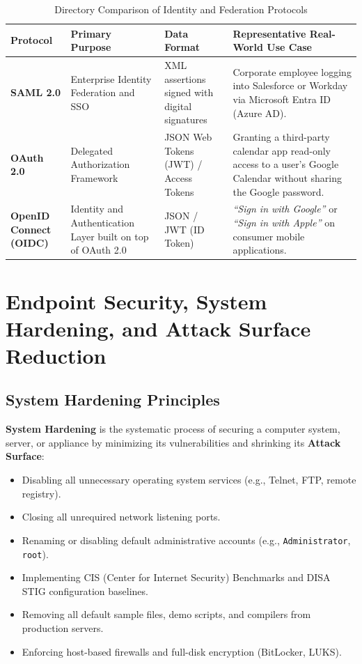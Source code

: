 \begin{table}[htbp]
\centering
\caption{Directory Comparison of Identity and Federation Protocols}
\label{tab:identity_protocols}
\begin{tabularx}{\textwidth}{p{2.5cm} p{2.8cm} X X}
\toprule
\textbf{Protocol} & \textbf{Primary Purpose} & \textbf{Data Format} & \textbf{Representative Real-World Use Case} \\
\midrule
\textbf{SAML 2.0} & Enterprise Identity Federation and SSO & XML assertions signed with digital signatures & Corporate employee logging into Salesforce or Workday via Microsoft Entra ID (Azure AD). \\
\textbf{OAuth 2.0} & Delegated Authorization Framework & JSON Web Tokens (JWT) / Access Tokens & Granting a third-party calendar app read-only access to a user's Google Calendar without sharing the Google password. \\
\textbf{OpenID Connect (OIDC)} & Identity and Authentication Layer built on top of OAuth 2.0 & JSON / JWT (ID Token) & \textit{``Sign in with Google''} or \textit{``Sign in with Apple''} on consumer mobile applications. \\
\bottomrule
\end{tabularx}
\end{table}

\newpage
\section{Endpoint Security, System Hardening, and Attack Surface Reduction}

\subsection{System Hardening Principles}

\textbf{System Hardening} is the systematic process of securing a computer system, server, or appliance by minimizing its vulnerabilities and shrinking its \textbf{Attack Surface}:
\begin{itemize}
\item Disabling all unnecessary operating system services (e.g., Telnet, FTP, remote registry).
\item Closing all unrequired network listening ports.
\item Renaming or disabling default administrative accounts (e.g., \texttt{Administrator}, \texttt{root}).
\item Implementing CIS (Center for Internet Security) Benchmarks and DISA STIG configuration baselines.
\item Removing all default sample files, demo scripts, and compilers from production servers.
\item Enforcing host-based firewalls and full-disk encryption (BitLocker, LUKS).
\end{itemize}

